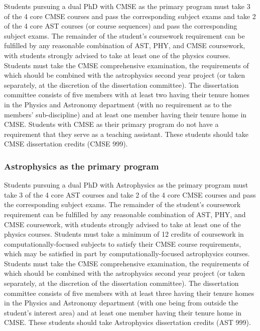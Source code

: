Students pursuing a dual PhD with CMSE as the primary program must
take 3 of the 4 core CMSE courses and pass the corresponding subject
exams and take 2 of the 4 core AST courses (or course sequences) and
pass the corresponding subject exams.  The remainder of the student's
coursework requirement can be fulfilled by any reasonable combination
of AST, PHY, and CMSE coursework, with students strongly advised to
take at least one of the physics courses.  Students must take the CMSE
comprehensive examination, the requirements of which should be
combined with the astrophysics second year project (or taken
separately, at the discretion of the dissertation committee).  The
dissertation committee consists of five members with at least two
having their tenure homes in the Physics and Astronomy department
(with no requirement as to the members' sub-discipline) and at least
one member having their tenure home in CMSE.  Students with CMSE as
their primary program do not have a requirement that they serve as a
teaching assistant.  These students should take CMSE dissertation
credits (CMSE 999).

\subsubsection{Astrophysics as the primary program}

Students pursuing a dual PhD with Astrophysics as the primary program
must take 3 of the 4 core AST courses and take 2 of the 4 core CMSE
courses and pass the corresponding subject exams.  The remainder of
the student's coursework requirement can be fulfilled by any
reasonable combination of AST, PHY, and CMSE coursework, with students
strongly advised to take at least one of the physics courses.  Students must take a minimum
of 12 credits of coursework in computationally-focused subjects to
satisfy their CMSE course requirements, which may be satisfied in part
by
computationally-focused astrophysics courses.
Students must take the CMSE comprehensive examination, the
requirements of which should be combined with the astrophysics second
year project (or taken separately, at the discretion of the
dissertation committee).  The dissertation committee consists of five
members with at least three having their tenure homes in the Physics
and Astronomy department (with one being from outside the student's
interest area) and at least one member having their tenure home in
CMSE.  These students should take Astrophysics dissertation credits
(AST 999).

